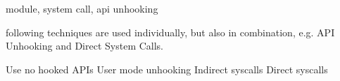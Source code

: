 


module, system call, api unhooking




following techniques are used individually, but also in combination, e.g. API Unhooking and Direct System Calls.

Use no hooked APIs
User mode unhooking
Indirect syscalls
Direct syscalls